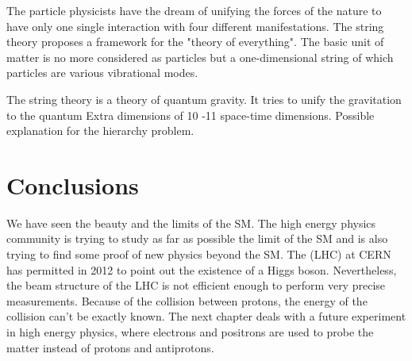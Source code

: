       The particle physicists have the dream of unifying the forces of the nature to have only one single interaction with four different manifestations.
      The string theory proposes a framework for the "theory of everything".
      The basic unit of matter is no more considered as particles but a one-dimensional string of which particles are various vibrational modes.

      The string theory is a theory of quantum gravity.
      It tries to unify the gravitation to the quantum 
      Extra dimensions of 10 -11 space-time dimensions.
      Possible explanation for the hierarchy problem.

    \section{Conclusions}

    We have seen the beauty and the limits of the \gls{SM}.
    The high energy physics community is trying to study as far as possible the limit of the \gls{SM} and is also trying to find some proof of new physics beyond the \gls{SM}.
    The (LHC) at CERN has permitted in 2012 to point out the existence of a Higgs boson.  
    Nevertheless, the beam structure of the LHC is not efficient enough to perform very precise measurements.
    Because of the collision between protons, the energy of the collision can't be exactly known.
    The next chapter deals with a future experiment in high energy physics, where electrons and positrons are used to probe the matter instead of protons and antiprotons.

